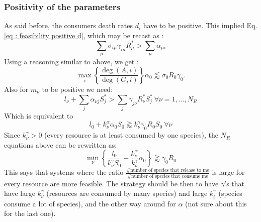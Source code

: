\documentclass[12pt, titlepage]{report}
\begin{document}
\subsubsection{Positivity of the parameters}
As said before, the consumers death rates $d_i$ have to be positive. This implied Eq.\eqref{eq : feasibility positive d}, which may be recast as :
\begin{equation}
\sum_\mu \sigma_{i\mu}\gamma_{i\mu}R^*_\mu > \sum_\mu \alpha_{\mu i}
\end{equation}
Using a reasoning similar to above, we get :
\begin{equation} \label{eq : feasability positivity d}
\boxed{
\max_i\left\{\frac{\deg(A,i)}{\deg(G,i)}\right\} \alpha_0 \lessapprox \sigma_0R_0 \gamma_0
}.
\end{equation}
Also for $m_\nu$ to be positive we need:
\begin{equation}
l_\nu + \sum_j \alpha_{\nu j} S^*_j > \sum_j \gamma_{j\nu}R^*_\nu S^*_j \ \forall \nu=1,\dots,N_R
\end{equation}
Which is equivalent to
\begin{equation}
l_0 + k_\nu^\alpha \alpha_0 S_0 \gtrapprox k_\nu^\gamma \gamma_0 R_0 S_0 \ \forall \nu
\end{equation}
Since $k_\nu^\gamma>0$ (every resource is at least consumed by one species), the $N_R$ equations above can be rewritten as:
\begin{equation} \label{eq : feasability positivity m}
\boxed{
\min_\nu\left\{\frac{l_0}{k_\nu^\gamma S_0} + \frac{k_\nu^\alpha}{k_\nu^\gamma}\alpha_0\right\} \gtrapprox \gamma_0 R_0
}
\end{equation}
This says that systems where the ratio $\frac{\#\text{number of species that release to me}}{\#\text{number of species that consume me}}$ is large for every resource are more feasible. The strategy should be then to have $\gamma$'s that have large $k^\gamma_\nu$ (\ie resources are consumed by many species) and large $k_i^\gamma$ (\ie species consume a lot of species), and the other way around for $\alpha$ (not sure about this for the last one).
\end{document}
